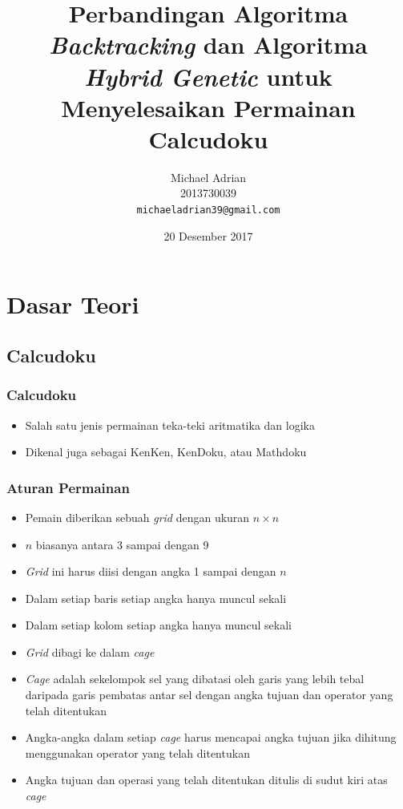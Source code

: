\documentclass{beamer}
\title{Perbandingan Algoritma \textit{Backtracking} dan Algoritma \textit{Hybrid Genetic} untuk Menyelesaikan Permainan Calcudoku}
\author{Michael Adrian \\ 2013730039 \\ \texttt{michaeladrian39@gmail.com}}
\institute{Program Studi Teknik Informatika \\ Fakultas Teknologi Informasi dan Sains \\ Universitas Katolik Parahyangan}
\date{20 Desember 2017}
\begin{document}
\begin{frame}
\titlepage
\end{frame}

\section{Dasar Teori}

\subsection{Calcudoku}

\begin{frame}
\frametitle{Calcudoku}
\begin{itemize}
\item Salah satu jenis permainan teka-teki aritmatika dan logika
\item Dikenal juga sebagai KenKen, KenDoku, atau Mathdoku
\end{itemize}
\end{frame}


\begin{frame}
\frametitle{Aturan Permainan}
\begin{itemize}
\item Pemain diberikan sebuah \textit{grid} dengan ukuran \begin{math}n \times n\end{math}
\item \begin{math}n\end{math} biasanya antara 3 sampai dengan 9
\item \textit{Grid} ini harus diisi dengan angka 1 sampai dengan \begin{math}n\end{math}
\item Dalam setiap baris setiap angka hanya muncul sekali
\item Dalam setiap kolom setiap angka hanya muncul sekali
\item \textit{Grid} dibagi ke dalam \textit{cage}
\item \textit{Cage} adalah sekelompok sel yang dibatasi oleh garis yang lebih tebal daripada garis pembatas antar sel dengan angka tujuan dan operator yang telah ditentukan
\item Angka-angka dalam setiap \textit{cage} harus mencapai angka tujuan jika dihitung menggunakan operator yang telah ditentukan
\item Angka tujuan dan operasi yang telah ditentukan ditulis di sudut kiri atas \textit{cage}
\end{itemize}
\end{frame}
\end{document}

